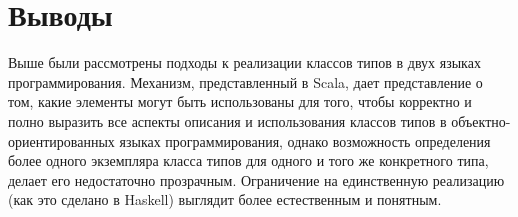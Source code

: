 \section{Выводы \label{sct:overview-conclusion}}

Выше были рассмотрены подходы к реализации классов типов в двух языках программирования. Механизм, представленный в Scala, дает представление о том, какие элементы могут быть использованы для того, чтобы корректно и полно выразить все аспекты описания и использования классов типов в объектно-ориентированных языках программирования, однако возможность определения более одного экземпляра класса типов для одного и того же конкретного типа, делает его недостаточно прозрачным. Ограничение на единственную реализацию (как это сделано в Haskell) выглядит более естественным и понятным.